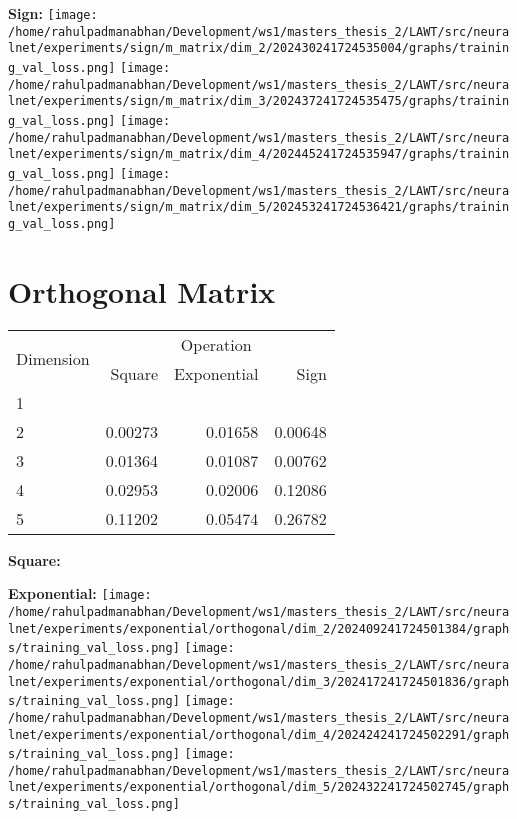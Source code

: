 \documentclass{article}
\begin{document}
\textbf{Sign:}
\texttt{[image: /home/rahulpadmanabhan/Development/ws1/masters\_thesis\_2/LAWT/src/neuralnet/experiments/sign/m\_matrix/dim\_2/202430241724535004/graphs/training\_val\_loss.png]}
\texttt{[image: /home/rahulpadmanabhan/Development/ws1/masters\_thesis\_2/LAWT/src/neuralnet/experiments/sign/m\_matrix/dim\_3/202437241724535475/graphs/training\_val\_loss.png]}
\texttt{[image: /home/rahulpadmanabhan/Development/ws1/masters\_thesis\_2/LAWT/src/neuralnet/experiments/sign/m\_matrix/dim\_4/202445241724535947/graphs/training\_val\_loss.png]}
\texttt{[image: /home/rahulpadmanabhan/Development/ws1/masters\_thesis\_2/LAWT/src/neuralnet/experiments/sign/m\_matrix/dim\_5/202453241724536421/graphs/training\_val\_loss.png]}


\pagebreak
\section{Orthogonal Matrix}
\begin{tabular}{@{}lrrr@{}}
\toprule
\multirow{2}{*}{Dimension} & \multicolumn{3}{c}{Operation} \\
\cmidrule(l){2-4}
& Square & Exponential & Sign \\
\midrule
1 & & & \\
2 & 0.00273 & 0.01658 & 0.00648 \\
3 & 0.01364 & 0.01087 & 0.00762 \\
4 & 0.02953 & 0.02006 & 0.12086 \\
5 & 0.11202 & 0.05474 & 0.26782 \\
\bottomrule
\end{tabular}

\textbf{Square:}

\textbf{Exponential:}
\texttt{[image: /home/rahulpadmanabhan/Development/ws1/masters\_thesis\_2/LAWT/src/neuralnet/experiments/exponential/orthogonal/dim\_2/202409241724501384/graphs/training\_val\_loss.png]}
\texttt{[image: /home/rahulpadmanabhan/Development/ws1/masters\_thesis\_2/LAWT/src/neuralnet/experiments/exponential/orthogonal/dim\_3/202417241724501836/graphs/training\_val\_loss.png]}
\texttt{[image: /home/rahulpadmanabhan/Development/ws1/masters\_thesis\_2/LAWT/src/neuralnet/experiments/exponential/orthogonal/dim\_4/202424241724502291/graphs/training\_val\_loss.png]}
\texttt{[image: /home/rahulpadmanabhan/Development/ws1/masters\_thesis\_2/LAWT/src/neuralnet/experiments/exponential/orthogonal/dim\_5/202432241724502745/graphs/training\_val\_loss.png]}
\end{document}
